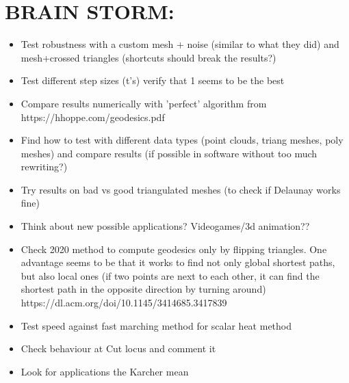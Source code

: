 \documentclass[sigconf]{acmart}
\begin{document}
\section{BRAIN STORM:}
\begin{itemize}
  \item Test robustness with a custom mesh + noise (similar to what they did) and mesh+crossed triangles (shortcuts should break the results?)
  \item Test different step sizes (t's) verify that 1 seems to be the best
  \item Compare results numerically with 'perfect' algorithm from https://hhoppe.com/geodesics.pdf
  \item Find how to test with different data types (point clouds, triang meshes, poly meshes) and compare results (if possible in software without too much rewriting?)
  \item Try results on bad vs good triangulated meshes (to check if Delaunay works fine)
  \item Think about new possible applications? Videogames/3d animation?? 
  \item Check 2020 method to compute geodesics only by flipping triangles. One advantage seems to be that it works to find not only global shortest paths, but also local ones (if two points are next to each other, it can find the shortest path in the opposite direction by turning around)  https://dl.acm.org/doi/10.1145/3414685.3417839
  \item Test speed against fast marching method for scalar heat method
  \item Check behaviour at Cut locus and comment it
  \item Look for applications the Karcher mean
\end{itemize}


\end{document}

